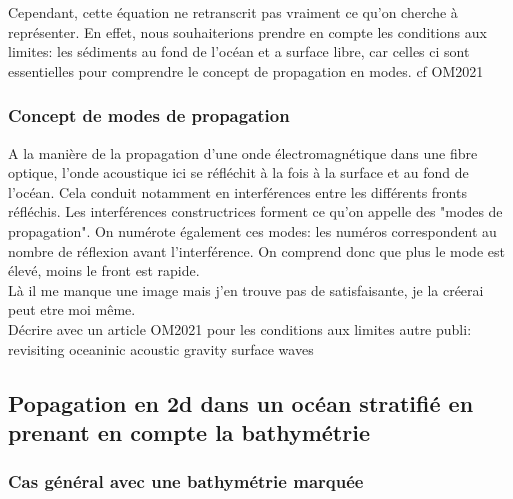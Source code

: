 \documentclass{rapportECC}
\begin{document}
Cependant, cette équation ne retranscrit pas vraiment ce qu'on cherche à représenter. En effet, nous souhaiterions prendre en compte les conditions aux limites: les sédiments au fond de l'océan et a surface libre, car celles ci sont essentielles pour comprendre le concept de propagation en modes. cf OM2021

\subsubsection{Concept de modes de propagation}

A la manière de la propagation d'une onde électromagnétique dans une fibre optique, l'onde acoustique ici se réfléchit à la fois à la surface et au fond de l'océan. Cela conduit notamment en interférences entre les différents fronts réfléchis. Les interférences constructrices forment ce qu'on appelle des "modes de propagation". On numérote également ces modes: les numéros correspondent au nombre de réflexion avant l'interférence. On comprend donc que plus le mode est élevé, moins le front est rapide. \\
Là il me manque une image mais j'en trouve pas de satisfaisante, je la créerai peut etre moi même.
\\

Décrire avec un article OM2021 pour les conditions aux limites
autre publi: revisiting oceaninic acoustic gravity surface waves

\subsection{Popagation en 2d dans un océan stratifié en prenant en compte la bathymétrie}


\subsubsection{Cas général avec une bathymétrie marquée}
\end{document}
